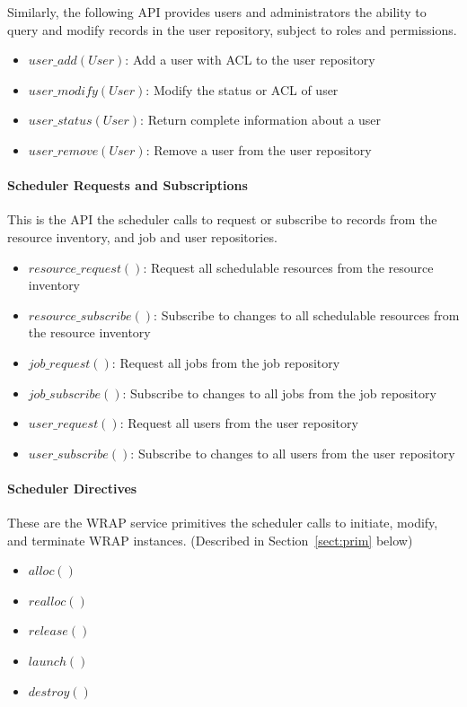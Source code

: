 Similarly, the following API provides users and administrators the
ability to query and modify records in the user repository, subject to
roles and permissions.

\begin{itemize}
\item{$user\_add(User)$: Add a user with ACL to the user repository}
\item{$user\_modify(User)$: Modify the status or ACL of user}
\item{$user\_status(User)$: Return complete information about a user}
\item{$user\_remove(User)$: Remove a user from the user repository}
\end{itemize}

\paragraph{Scheduler Requests and Subscriptions}
This is the API the scheduler calls to request or subscribe to records
from the resource inventory, and job and user repositories.

\begin{itemize}
\item{$resource\_request()$: Request all schedulable resources from
  the resource inventory}
\item{$resource\_subscribe()$: Subscribe to changes to all schedulable
  resources from the resource inventory}
\item{$job\_request()$: Request all jobs from the job repository}
\item{$job\_subscribe()$: Subscribe to changes to all jobs from the
  job repository}
\item{$user\_request()$: Request all users from the user repository}
\item{$user\_subscribe()$: Subscribe to changes to all users from the
  user repository}
\end{itemize}

\paragraph{Scheduler Directives}
These are the WRAP service primitives the scheduler calls to initiate,
modify, and terminate WRAP instances. (Described in
Section~\ref{sect:prim} below)

\begin{itemize}
\item{$alloc()$}
\item{$realloc()$}
\item{$release()$}
\item{$launch()$}
\item{$destroy()$}
\end{itemize}

